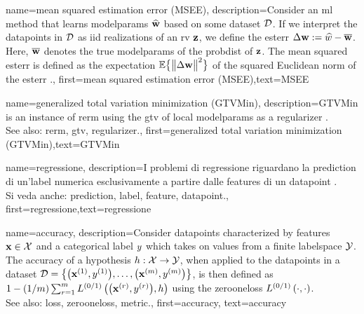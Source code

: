 {name={mean squared estimation error (MSEE)},
	description={Consider an \gls{ml} method that 
		learns \gls{modelparams} $\widehat{{\bf w}}$ based on some \gls{dataset} $\mathcal{D}$. 
		If we interpret the \gls{datapoint}s in $\mathcal{D}$ as \gls{iid} \gls{realization}s of an \gls{rv} ${\bf z}$, 
		we define the \gls{esterr} $\Delta {\bf w} := \widehat{w} - \overline{{\bf w}}$. 
		Here, $\overline{{\bf w}}$ denotes the true \gls{modelparams} of the \gls{probdist} 
		of ${\bf z}$. The \gls{mean} squared \gls{esterr} is 
		defined as the \gls{expectation} $\mathbb{E} \big\{ \big\| \Delta {\bf w} \big\|^{2} \big\}$ of the 
		squared Euclidean \gls{norm} of the \gls{esterr} \cite{LC,kay}.},
	first={mean squared estimation error (MSEE)},text={MSEE} 
}

{name={generalized total variation minimization (GTVMin)},
	description={GTVMin is an instance of \gls{rerm} 
		using the \gls{gtv} of local \gls{modelparams} as a \gls{regularizer} \cite{ClusteredFLTVMinTSP}.
					\\ 
		See also: \gls{rerm}, \gls{gtv}, \gls{regularizer}.},
	first={generalized total variation minimization (GTVMin)},text={GTVMin} 
}

{name={regressione},
	description={I problemi di regressione riguardano la 
		\gls{prediction} di un'\gls{label} numerica esclusivamente a partire dalle \glspl{feature} di un \gls{datapoint} \cite[Ch. 2]{MLBasics}.
					\\ 
		Si veda anche: \gls{prediction}, \gls{label}, \gls{feature}, \gls{datapoint}.},
	first={regressione},text={regressione} 
}

{name={accuracy},
	description={Consider \glspl{datapoint} characterized by \glspl{feature} ${\bf x} \in \mathcal{X}$ and 
		a categorical \gls{label} $y$ which takes on values from a finite \gls{labelspace} $\mathcal{Y}$. The 
		accuracy of a \gls{hypothesis} $h: \mathcal{X} \rightarrow \mathcal{Y}$, when applied 
		to the \glspl{datapoint} in a \gls{dataset} $\mathcal{D} = \big\{ \big({\bf x}^{(1)}, y^{(1)} \big), \ldots, \big({\bf x}^{(m)},y^{(m)}\big) \big\}$, 
		is then defined as $1 - (1/m)\sum_{r=1}^{m} L^{(0/1)}\left(\big({\bf x}^{(r)},y^{(r)}\big),h \right)$ using the \gls{zerooneloss} $L^{(0/1)}\left(\cdot,\cdot \right)$.
					\\ 
		See also: \gls{loss}, \gls{zerooneloss}, \gls{metric}.},
	first={accuracy},
	text={accuracy} 
}






